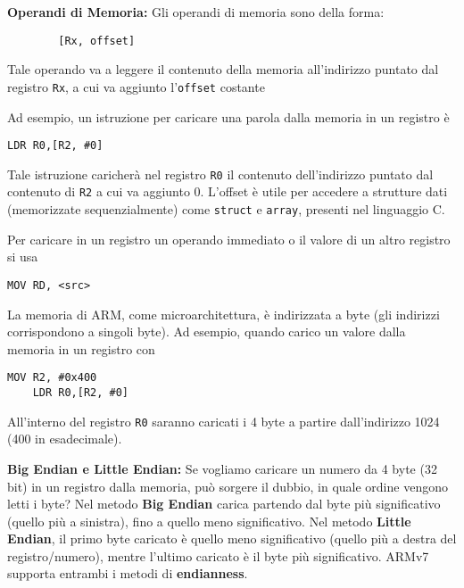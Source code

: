 \begin{defn}
	\textbf{Operandi di Memoria:}
	Gli operandi di memoria sono della forma:
	\begin{lstlisting}
		[Rx, offset]
	\end{lstlisting}
	
	Tale operando va a leggere il contenuto della memoria all'indirizzo puntato dal registro \verb|Rx|, a cui va aggiunto l'\verb|offset| costante
	
	Ad esempio, un istruzione per caricare una parola dalla memoria in un registro è 
	\begin{lstlisting}[style=arm]
	LDR R0,[R2, #0]
	\end{lstlisting}
	
	Tale istruzione caricherà nel registro \verb|R0| il contenuto dell'indirizzo puntato dal contenuto di \verb|R2| a cui va aggiunto 0. L'offset è utile per accedere a strutture dati (memorizzate sequenzialmente) come \verb|struct| e \verb|array|, presenti nel linguaggio C.
	
	Per caricare in un registro un operando immediato o il valore di un altro registro si usa
	\begin{lstlisting}[style=arm]
		MOV RD, <src>
	\end{lstlisting}
\end{defn}

\begin{note}
	La memoria di ARM, come microarchitettura, è indirizzata a byte (gli indirizzi corrispondono a singoli byte). Ad esempio, quando carico un valore dalla memoria in un registro con
	\begin{lstlisting}[style=arm]
	MOV R2, #0x400
	LDR R0,[R2, #0]
	\end{lstlisting}
	
	All'interno del registro \verb|R0| saranno caricati i 4 byte a partire dall'indirizzo 1024 (400 in esadecimale).
\end{note}

\begin{defn}
	\textbf{Big Endian e Little Endian:} Se vogliamo caricare un numero da 4 byte (32 bit) in un registro dalla memoria, può sorgere il dubbio, in quale ordine vengono letti i byte? Nel metodo \textbf{Big Endian} carica partendo dal byte più significativo (quello più a sinistra), fino a quello meno significativo. Nel metodo \textbf{Little Endian}, il primo byte caricato è quello meno significativo (quello più a destra del registro/numero), mentre l'ultimo caricato è il byte più significativo. ARMv7 supporta entrambi i metodi di \textbf{endianness}.
\end{defn}

